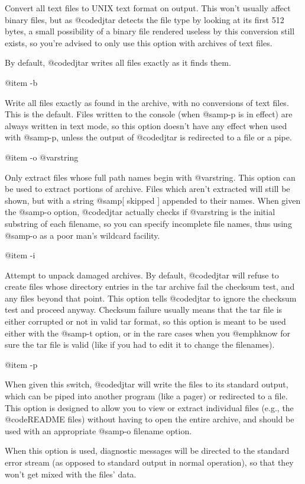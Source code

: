 Convert all text files to UNIX text format on output.  This won't usually
affect binary files, but as @code{djtar} detects the file type by looking
at its first 512 bytes, a small possibility of a binary file rendered
useless by this conversion still exists, so you're advised to only use
this option with archives of text files.

By default, @code{djtar} writes all files exactly as it finds them.

@item -b

Write all files exactly as found in the archive, with no conversions of
text files.  This is the default.
Files written to the console (when @samp{-p} is in effect) are always
written in text mode, so this option doesn't have any effect when used
with @samp{-p}, unless the output of @code{djtar} is redirected to a file
or a pipe.

@item -o @var{string}

Only extract files whose full path names begin with @var{string}.
This option can be used to extract portions of archive.  Files which aren't
extracted will still be shown, but with a string @samp{[ skipped ]}
appended to their names.  When given the @samp{-o} option, @code{djtar}
actually checks if @var{string} is the initial substring of each filename,
so you can specify incomplete file names, thus using @samp{-o} as a poor man's
wildcard facility.

@item -i

Attempt to unpack damaged archives.
By default, @code{djtar} will refuse to create files whose directory
entries in the tar archive fail the checksum test, and any files beyond
that point.  This option tells @code{djtar} to ignore the checksum test
and proceed anyway.  Checksum failure usually means that the tar file is
either corrupted or not in valid tar format, so this option is meant to be
used either with the @samp{-t} option, or in the rare cases when you
@emph{know} for sure the tar file is valid (like if you had to edit it to
change the filenames).

@item -p

When given this switch, @code{djtar} will write the files to its standard
output, which can be piped into another program (like a pager) or
redirected to a file.  This option is designed to allow you to view or
extract individual files (e.g., the @code{README} files) without having to
open the entire archive, and should be used with an appropriate @samp{-o
filename} option.

When this option is used, diagnostic messages will be directed to the
standard error stream (as opposed to standard output in normal operation),
so that they won't get mixed with the files' data.


